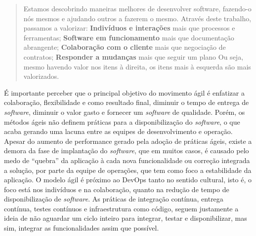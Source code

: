 \documentclass[twoside,english,brazilian]{UNISINOSartigo}
\begin{document}
\begin{quote}
Estamos descobrindo maneiras melhores de desenvolver 
software, fazendo-o nós mesmos e ajudando outros a 
fazerem o mesmo. Através deste trabalho, passamos a valorizar: \textbf{Indivíduos e interações} mais que processos e ferramentas; \textbf{Software em funcionamento} mais que documentação abrangente; \textbf{Colaboração com o cliente} mais que negociação de contratos; \textbf{Responder a mudanças} mais que seguir um plano
Ou seja, mesmo havendo valor nos itens à direita, os itens mais à esquerda são mais valorizados.
\end{quote}

É importante perceber que o principal objetivo do movimento ágil é enfatizar a colaboração, flexibilidade e como resultado final, diminuir o tempo de entrega de \textit{software}, diminuir o valor gasto e fornecer um \textit{software} de qualidade. Porém, os métodos ágeis não definem práticas para a disponibilização do \textit{software}, o que acaba gerando uma lacuna entre as equipes de desenvolvimento e operação. Apesar do aumento de performance gerado pela adoção de práticas ágeis, existe a demora da fase de implantação do \textit{software}, que em muitos casos, é causado pelo medo de ``quebra'' da aplicação à cada nova funcionalidade ou correção integrada a solução, por parte da equipe de operações, que tem como foco a estabilidade da aplicação.
O modelo ágil é próximo ao DevOps tanto no sentido cultural, isto é, o foco está nos indivíduos e na colaboração, quanto na redução de tempo de disponibilização de \textit{software}. As práticas de integração contínua, entrega contínua, testes contínuos e  infraestrutura como código, seguem justamente a ideia de não aguardar um ciclo inteiro para integrar, testar e disponibilizar, mas sim, integrar as funcionalidades assim que possível.
\end{document}
